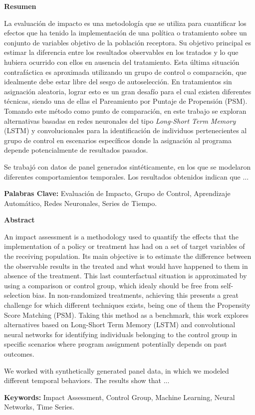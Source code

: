 \documentclass[../main.tex]{subfiles}
\begin{document}
\noindent \textbf{Resumen}

La evaluación de impacto es una metodología que se utiliza para cuantificar los efectos
que ha tenido la implementación de una política o tratamiento sobre un conjunto de
variables objetivo de la población receptora. Su objetivo principal es estimar la
diferencia entre los resultados observables en los tratados y lo que hubiera ocurrido con
ellos en ausencia del tratamiento. Esta última situación contrafáctica es aproximada
utilizando un grupo de control o comparación, que idealmente debe estar libre del sesgo de
autoselección. En tratamientos sin asignación aleatoria, lograr esto es un gran desafío
para el cual existen diferentes técnicas, siendo una de ellas el Pareamiento por Puntaje
de Propensión (PSM). Tomando este método como punto de comparación, en este trabajo se
exploran alternativas basadas en redes neuronales del tipo \textit{Long-Short Term Memory}
(LSTM) y convolucionales para la identificación de individuos pertenecientes al grupo de
control en escenarios específicos donde la asignación al programa depende potencialmente
de resultados pasados.

Se trabajó con datos de panel generados sintéticamente, en los que se modelaron diferentes
comportamientos temporales. Los resultados obtenidos indican que ...

\medskip

\noindent \textbf{Palabras Clave: } Evaluación de Impacto, Grupo de Control, Aprendizaje
Automático, Redes Neuronales, Series de Tiempo.

\bigskip
\bigskip

\noindent \textbf{Abstract}

An impact assessment is a methodology used to quantify the effects that the implementation
of a policy or treatment has had on a set of target variables of the receiving population.
Its main objective is to estimate the difference between the observable results in the
treated and what would have happened to them in absence of the treatment. This last
counterfactual situation is approximated by using a comparison or control group, which
idealy should be free from self-selection bias. In non-randomized treatments, achieving
this presents a great challenge for which different techniques exists, being one of them
the Propensity Score Matching (PSM). Taking this method as a benchmark, this work explores
alternatives based on Long-Short Term Memory (LSTM) and convolutional neural networks for
identifying individuals belonging to the control group in specific scenarios where program
assignment potentially depends on past outcomes.

We worked with synthetically generated panel data, in which we modeled different temporal
behaviors. The results show that ...

\medskip

\noindent \textbf{Keywords: } Impact Assessment, Control Group, Machine Learning, Neural
Networks, Time Series.
\end{document}
